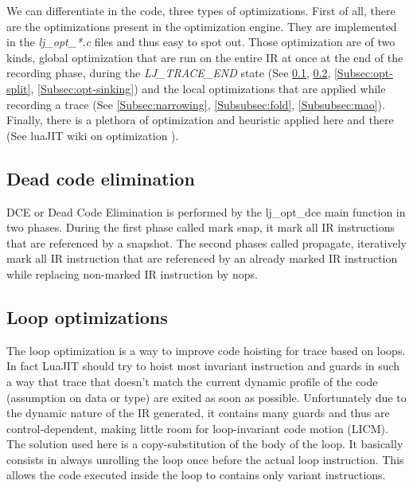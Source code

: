 
We can differentiate in the code, three types of optimizations.
First of all, there are the optimizations present in the optimization engine.
They are implemented in the \emph{lj\_opt\_*.c} files and thus easy to spot out.
Those optimization are of two kinds, global optimization that are run on the
entire IR at once at the end of the recording phase, during the
\emph{LJ\_TRACE\_END} state (See \ref{Subsec:opt-dce}, \ref{Subsec:opt-loop},
\ref{Subsec:opt-split}, \ref{Subsec:opt-sinking}) and the local optimizations
that are applied while recording a trace (See \ref{Subsec:narrowing},
\ref{Subsubsec:fold}, \ref{Subsubsec:mao}). Finally, there is a plethora of
optimization and heuristic applied here and there (See luaJIT wiki on
optimization \cite{luajit-opt}).


\subsection{Dead code elimination}
\label{Subsec:opt-dce}

DCE or Dead Code Elimination is performed by the lj\_opt\_dce main function
in two phases. During the first phase called mark snap, it mark all IR
instructions that are referenced by a snapshot. The second phases called
propagate, iteratively mark all IR instruction that are referenced by an already
marked IR instruction while replacing non-marked IR instruction by nops.


\subsection{Loop optimizations}
\label{Subsec:opt-loop}

The loop optimization is a way to improve code hoisting for trace based on
loops. In fact LuaJIT should try to hoist most invariant instruction and guards
in such a way that trace that doesn't match the current dynamic profile of
the code (assumption on data or type) are exited as soon as possible.
Unfortunately due to the dynamic nature of the IR generated, it contains many
guards and thus are control-dependent, making little room for loop-invariant
code motion (LICM). The solution used here is a copy-substitution of the body
of the loop. It basically consists in always unrolling the loop once before the
actual loop instruction. This allows the code executed inside the loop to
contains only variant instructions.

